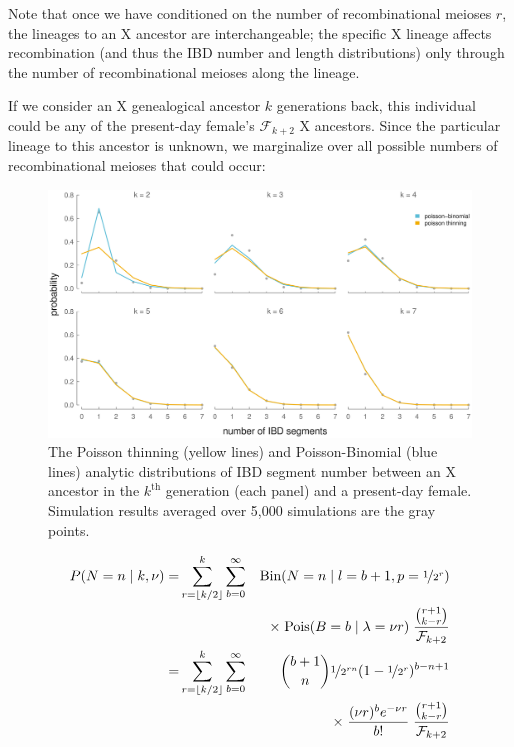 \documentclass[9pt,twocolumn,twoside]{gsajnl}
\begin{document}
Note that once we have conditioned on the number of recombinational meioses $r$,
the lineages to an X ancestor are interchangeable; the specific X lineage
affects recombination (and thus the IBD number and length distributions) only
through the number of recombinational meioses along the lineage. 

If we consider an X genealogical ancestor $k$ generations back, this individual
could be any of the present-day female's $\mathcal{F}_{k+2}$ X ancestors. Since
the particular lineage to this ancestor is unknown, we marginalize over all
possible numbers of recombinational meioses that could occur:

\begin{figure}[!ht]
  \centering
  \includegraphics[width=\textwidth]{images/x-ancestor-blockcounts}

  \caption{The Poisson thinning (yellow lines) and Poisson-Binomial (blue
  lines) analytic distributions of IBD segment number between an X ancestor in
the $k^\text{th}$ generation (each panel) and a present-day female. Simulation
results averaged over 5,000 simulations are the gray points.}

  \label{fig:x-ancestor-blockcounts}

\end{figure}

\begin{align*}
  P(N=n \;|\; k, \nu) =& \sum_{r=\lfloor k/2 \rfloor}^k \sum_{b=0}^\infty &\text{Bin}(N=n \;|\; l=b+1, p=\nicefrac{1}{2^r}) \\ \nonumber 
  & &\times \; \text{Pois}(B=b \;|\; \lambda=\nu r) \; \frac{{r+1 \choose k-r}}{\mathcal{F}_{k+2}} \nonumber \\
  =& \sum_{r=\lfloor k/2 \rfloor}^k \sum_{b=0}^\infty &{b + 1 \choose n } \nicefrac{1}{2^{rn}}(1 - \nicefrac{1}{2^r})^{b - n + 1} \\ \nonumber
  & & \times \; \frac{(\nu r)^b e^{-\nu r}}{b!} \; \frac{{r+1 \choose k-r}}{\mathcal{F}_{k+2}}
\end{align*}
\end{document}
